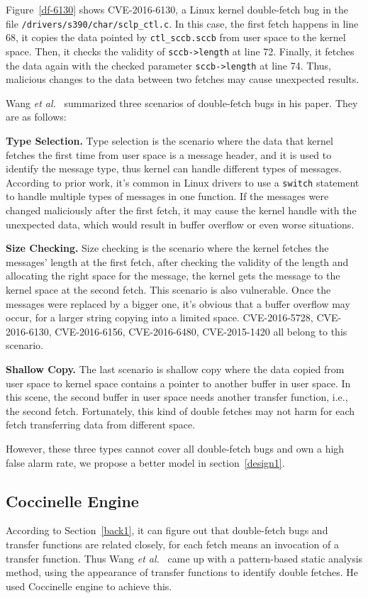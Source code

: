 \documentclass[10pt]{llncs}
\begin{document}
Figure~\ref{df-6130} shows CVE-2016-6130, a Linux kernel double-fetch bug in the file \verb:/drivers/s390/char/sclp_ctl.c:. In this case, the first fetch happens in line 68, it copies the data pointed by \verb:ctl_sccb.sccb: from user space to the kernel space. Then, it checks the validity of \verb:sccb->length: at line 72. Finally, it fetches the data again with the checked parameter \verb:sccb->length: at line 74. Thus, malicious changes to the data between two fetches may cause unexpected results.

Wang \textit{et al.}~\cite{wang} summarized three scenarios of double-fetch bugs in his paper. They are as follows:

\textbf{Type Selection.}
Type selection is the scenario where the data that kernel fetches the first time from user space is a message header, and it is used to identify the message type, thus kernel can handle different types of messages. According to prior work, it's common in Linux drivers to use a \verb:switch: statement to handle multiple types of messages in one function. If the messages were changed maliciously after the first fetch, it may cause the kernel handle with the unexpected data, which would result in buffer overflow or even worse situations.

\textbf{Size Checking.}
Size checking is the scenario where the kernel fetches the messages' length at the first fetch, after checking the validity of the length and allocating the right space for the message, the kernel gets the message to the kernel space at the second fetch. This scenario is also vulnerable. Once the messages were replaced by a bigger one, it's obvious that a buffer overflow may occur, for a larger string copying into a limited space. CVE-2016-5728, CVE-2016-6130, CVE-2016-6156, CVE-2016-6480, CVE-2015-1420 all belong to this scenario.

\textbf{Shallow Copy.}
The last scenario is shallow copy where the data copied from user space to kernel space contains a pointer to another buffer in user space. In this scene, the second buffer in user space needs another transfer function, i.e., the second fetch. Fortunately, this kind of double fetches may not harm for each fetch transferring data from different space.

However, these three types cannot cover all double-fetch bugs and own a high false alarm rate, we propose a better model in section~\ref{design1}.

\subsection{Coccinelle Engine}
\label{back2}
According to Section~\ref{back1}, it can figure out that double-fetch bugs and transfer functions are related closely, for each fetch means an invocation of a transfer function. Thus Wang \textit{et al.}~\cite{wang} came up with a pattern-based static analysis method, using the appearance of transfer functions to identify double fetches. He used Coccinelle engine to achieve this.
\end{document}

